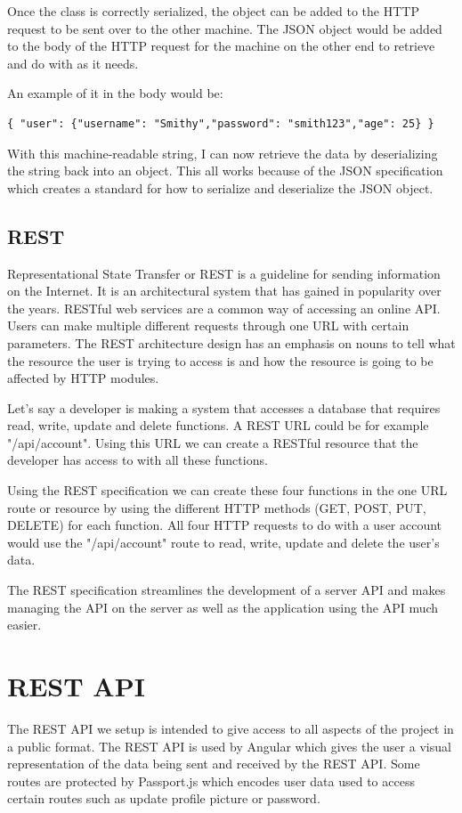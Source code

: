 Once the class is correctly serialized, the object can be added to the HTTP request to be sent over to the other machine. The JSON object would be added to the body of the HTTP request for the machine on the other end to retrieve and do with as it needs.

An example of it in the body would be:
\begin{verbatim}
{ "user": {"username": "Smithy","password": "smith123","age": 25} }
\end{verbatim}

With this machine-readable string, I can now retrieve the data by deserializing the string back into an object. This all works because of the JSON specification which creates a standard for how to serialize and deserialize the JSON object.

\subsection{REST}
Representational State Transfer or REST is a guideline for sending information on the Internet. It is an architectural system that has gained in popularity over the years. RESTful web services are a common way of accessing an online API. Users can make multiple different requests through one URL with certain parameters. The REST architecture design has an emphasis on nouns to tell what the resource the user is trying to access is and how the resource is going to be affected by HTTP modules. 

Let's say a developer is making a system that accesses a database that requires read, write, update and delete functions. A REST URL could be for example "/api/account". Using this URL we can create a RESTful resource that the developer has access to with all these functions.

Using the REST specification we can create these four functions in the one URL route or resource by using the different HTTP methods (GET, POST, PUT, DELETE) for each function. All four HTTP requests to do with a user account would use the "/api/account" route to read, write, update and delete the user's data.

The REST specification streamlines the development of a server API and makes managing the API on the server as well as the application using the API much easier.

\section{REST API}
The REST API we setup is intended to give access to all aspects of the project in a public format. The REST API is used by Angular which gives the user a visual representation of the data being sent and received by the REST API. Some routes are protected by Passport.js which encodes user data used to access certain routes such as update profile picture or password.

